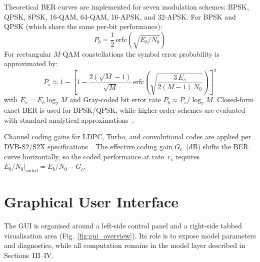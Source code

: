 \documentclass[telecom,article,submit,pdftex,moreauthors]{Definitions/mdpi}
\begin{document}
Theoretical BER curves are implemented for seven modulation schemes:
BPSK, QPSK, 8PSK, 16-QAM, 64-QAM, 16-APSK, and 32-APSK.  For BPSK
and QPSK (which share the same per-bit performance):
\begin{equation}
  P_b = \frac{1}{2}\,\mathrm{erfc}\!\left(\sqrt{E_b/N_0}\right)
  \label{eq:bpsk_ber}
\end{equation}
For rectangular $M$-QAM constellations the symbol error probability is
approximated by:
\begin{equation}
  P_s \approx 1 - \left[1 - \frac{2(\sqrt{M}-1)}{\sqrt{M}}\,
    \mathrm{erfc}\!\left(\sqrt{\frac{3\,E_s}{2(M-1)\,N_0}}\right)
    \right]^{\!2}
  \label{eq:mqam_ser}
\end{equation}
with $E_s = E_b \log_2 M$ and Gray-coded bit error rate
$P_b \approx P_s / \log_2 M$.
Closed-form exact BER is used for BPSK/QPSK, while higher-order
schemes are evaluated with standard analytical approximations~\cite{sklar2001}.

Channel coding gains for LDPC, Turbo, and convolutional codes are applied
per DVB-S2/S2X specifications~\cite{dvbs2}.  The effective coding gain
$G_c$~(dB) shifts the BER curve horizontally, so the coded performance
at rate~$r_c$ requires $E_b/N_0 |_{\text{coded}} = E_b/N_0 - G_c$.


\section{Graphical User Interface}
\label{sec:gui}

The GUI is organised around a left-side control panel and a right-side
tabbed visualisation area (Fig.~\ref{fig:gui_overview}). Its role is to expose
model parameters and diagnostics, while all computation remains in the model
layer described in Sections~III--IV.
\end{document}
